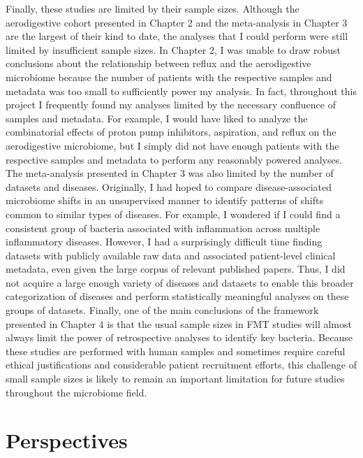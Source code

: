 Finally, these studies are limited by their sample sizes.
Although the aerodigestive cohort presented in Chapter 2 and the meta-analysis in Chapter 3 are the largest of their kind to date, the analyses that I could perform were still limited by insufficient sample sizes.
In Chapter 2, I was unable to draw robust conclusions about the relationship between reflux and the aerodigestive microbiome because the number of patients with the respective samples and metadata was too small to sufficiently power my analysis.
In fact, throughout this project I frequently found my analyses limited by the necessary confluence of samples and metadata.
For example, I would have liked to analyze the combinatorial effects of proton pump inhibitors, aspiration, and reflux on the aerodigestive microbiome, but I simply did not have enough patients with the respective samples and metadata to perform any reasonably powered analyses.
The meta-analysis presented in Chapter 3 was also limited by the number of datasets and diseases.
Originally, I had hoped to compare disease-associated microbiome shifts in an unsupervised manner to identify patterns of shifts common to similar types of diseases.
For example, I wondered if I could find a consistent group of bacteria associated with inflammation across multiple inflammatory diseases.
However, I had a surprisingly difficult time finding datasets with publicly available raw data and associated patient-level clinical metadata, even given the large corpus of relevant published papers.
Thus, I did not acquire a large enough variety of diseases and datasets to enable this broader categorization of diseases and perform statistically meaningful analyses on these groups of datasets.
Finally, one of the main conclusions of the framework presented in Chapter 4 is that the usual sample sizes in FMT studies will almost always limit the power of retrospective analyses to identify key bacteria.
Because these studies are performed with human samples and sometimes require careful ethical justifications and considerable patient recruitment efforts, this challenge of small sample sizes is likely to remain an important limitation for future studies throughout the microbiome field.

\section{Perspectives}


